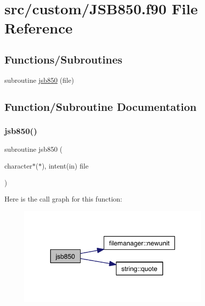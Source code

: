 \hypertarget{_j_s_b850_8f90}{}\section{src/custom/\+J\+S\+B850.f90 File Reference}
\label{_j_s_b850_8f90}
\subsection*{Functions/\+Subroutines}
\begin{DoxyCompactItemize}
\item 
subroutine \hyperlink{_j_s_b850_8f90_a2b5b3036338f8ad787c3c1daf838e179}{jsb850} (file)
\end{DoxyCompactItemize}


\subsection{Function/\+Subroutine Documentation}
\mbox{\label{_j_s_b850_8f90_a2b5b3036338f8ad787c3c1daf838e179}} 
\subsubsection{\texorpdfstring{jsb850()}{jsb850()}}
{\footnotesize\ttfamily subroutine jsb850 (\begin{DoxyParamCaption}\item[{character$\ast$($\ast$), intent(in)}]{file }\end{DoxyParamCaption})}

Here is the call graph for this function\+:\nopagebreak
\begin{figure}[H]
\begin{center}
\leavevmode
\includegraphics[width=270pt]{_j_s_b850_8f90_a2b5b3036338f8ad787c3c1daf838e179_cgraph}
\end{center}
\end{figure}
